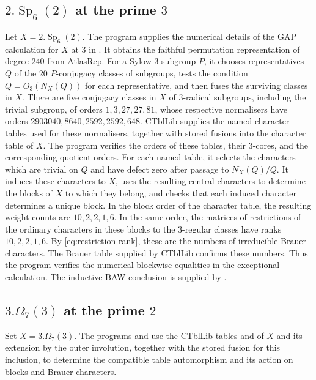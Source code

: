 \documentclass[10pt]{amsart}
\theoremstyle{definition}
\DeclareMathOperator{\Sp}{Sp}
\newcommand{\GAP}{\textsf{GAP}}
\numberwithin{equation}{section}
\numberwithin{table}{section}
\begin{document}
\subsection{\texorpdfstring{$2.\Sp_6(2)$ at the prime $3$}{2.Sp6(2) at the prime 3}}
\label{app:sp6}

Let $X=2.\Sp_6(2)$.  The program  supplies the numerical
details of the \GAP{}
calculation for $X$ at $3$ in
\cite[proof of Theorem~5.5]{SchaefferFry2014}.  It obtains the faithful
permutation representation of degree $240$ from AtlasRep.  For a Sylow
$3$-subgroup $P$, it chooses representatives $Q$ of the $20$
$P$-conjugacy classes of subgroups, tests the condition
$Q=O_3(N_X(Q))$ for each representative, and then fuses the surviving
classes in $X$.  There are five conjugacy classes in $X$ of $3$-radical
subgroups, including the trivial subgroup, of orders
$1,3,27,27,81$, whose respective normalisers have orders
$2903040,8640,2592,2592,648$.
CTblLib supplies the named character tables used for these normalisers,
together with stored fusions into the character table of $X$.
The program verifies the orders of these tables, their
$3$-cores, and the corresponding quotient orders.  For each named table, it
selects the characters which are trivial on $Q$ and have defect zero after
passage to $N_X(Q)/Q$.  It induces these characters to $X$, uses the
resulting central characters to determine the blocks of $X$ to which they belong, and checks
that each induced character determines a unique block.  In the
block order of the character table, the resulting
weight counts are $10,2,2,1,6$.
In the same order, the matrices of restrictions of the ordinary characters in
these blocks to the $3$-regular classes have ranks $10,2,2,1,6$.  By \eqref{eq:restriction-rank},
these are the numbers of irreducible Brauer characters.  The Brauer table
supplied by CTblLib confirms these numbers.
Thus the program verifies the numerical blockwise equalities in the
exceptional calculation.  The inductive BAW conclusion is supplied by
\cite[Theorem~5.5]{SchaefferFry2014}.

\subsection{\texorpdfstring{$3.\Omega_7(3)$ at the prime $2$}{3.Omega7(3) at the prime 2}}
\label{app:type-b-computation}

Set $X=3.\Omega_7(3)$. The programs  and
 use the CTblLib tables  and
 of $X$ and its extension by the outer involution,
together with the stored fusion for this inclusion, to determine the
compatible table automorphism and its action on blocks and Brauer
characters.
\end{document}

